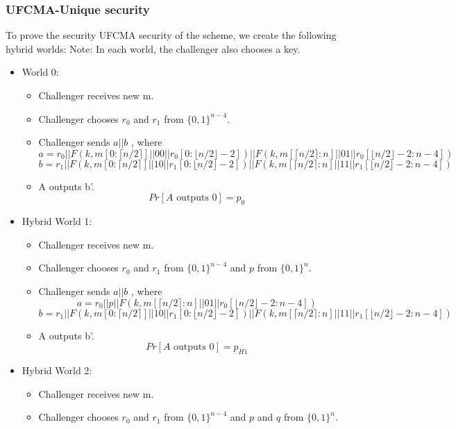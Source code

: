 \documentclass{article}
\begin{document}
\subsubsection{UFCMA-Unique security}
To prove the security UFCMA security of the scheme, we create the following hybrid worlds:
Note: In each world, the challenger also chooses a key.
\begin{itemize}
        \item World 0: 
        \begin{itemize}
            \item Challenger receives new m.
            \item Challenger chooses $r_0$ and $r_1$ from $\{0,1\}^{n-4}$.
            \item Challenger sends $a||b$ , where
\[a=r_0\big|\big| F(k,m[0:\lceil n/2 \rceil ]\big|\big|00\big|\big|r_0[0:\lfloor n/2 \rfloor -2])\big|\big|F(k,m[\lceil n/2 \rceil:n ]\big|\big|01\big|\big|r_0[\lfloor n/2 \rfloor -2:n-4])\]
\[b=r_1\big|\big|F(k,m[0:\lceil n/2 \rceil ]\big|\big|10\big|\big|r_1[0:\lfloor n/2 \rfloor -2])\big|\big|F(k,m[\lceil n/2 \rceil:n ]\big|\big|11\big|\big|r_1[\lfloor n/2 \rfloor -2:n-4])\]
            \item A outputs b'.
            \[Pr[A \text{ outputs }0]=p_0\]
        \end{itemize}
        \item Hybrid World 1:
        \begin{itemize}
            \item Challenger receives new m.
            \item Challenger chooses $r_0$ and $r_1$ from $\{0,1\}^{n-4}$ and $p$ from $\{0,1\}^{n}$.
            \item Challenger sends $a||b$ , where
\[a=r_0\big|\big|p\big|\big|F(k,m[\lceil n/2 \rceil:n ]\big|\big|01\big|\big|r_0[\lfloor n/2 \rfloor -2:n-4])\]
\[b=r_1\big|\big|F(k,m[0:\lceil n/2 \rceil ]\big|\big|10\big|\big|r_1[0:\lfloor n/2 \rfloor -2])\big|\big|F(k,m[\lceil n/2 \rceil:n ]\big|\big|11\big|\big|r_1[\lfloor n/2 \rfloor -2:n-4])\]
            \item A outputs b'.
            \[Pr[A \text{ outputs }0]=p_{H1}\]
        \end{itemize}
        \item Hybrid World 2:
        \begin{itemize}
            \item Challenger receives new m.
            \item Challenger chooses $r_0$ and $r_1$ from $\{0,1\}^{n-4}$ and $p$ and $q$ from $\{0,1\}^{n}$.

\end{itemize}
\end{itemize}
\end{document}
